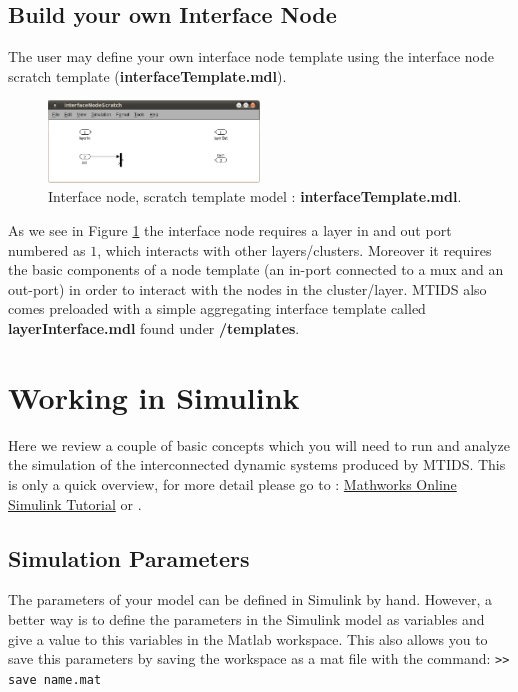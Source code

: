 \documentclass[a4paper,twoside, openright,12pt]{report}
\begin{document}
\pagebreak

\subsection{Build your own Interface Node}

The user may define your own interface node template using the interface node scratch template (\textbf{interfaceTemplate.mdl}). \\

\begin{figure}[htb]
\centering
\includegraphics[width=0.5\textwidth]{pics/interfaceTemplate.eps}
\caption[MTIDS interface node scratch template]{Interface node, scratch template model : \textbf{interfaceTemplate.mdl}.}
\label{interfaceFig}
\end{figure}
 
As we see in Figure \ref{interfaceFig} the interface node requires a layer in and out port numbered as $1$, which interacts with other layers/clusters. 
Moreover it requires the basic components of a node template (an in-port connected to a mux and an out-port) in order to interact with the nodes in the cluster/layer.
MTIDS also comes preloaded with a simple aggregating interface template called \textbf{layerInterface.mdl} found under \textbf{/templates}.
 


 

\section{Working in Simulink}\label{workinginsimulink}

Here we review a couple of basic concepts which you will need to run and analyze the simulation of the interconnected dynamic 
systems produced by MTIDS. This is only a quick overview, for more detail please go to : \href{http://www.mathworks.com/help/toolbox/simulink/simulink_product_page.html}{Mathworks Online Simulink Tutorial} or \cite{MatlabBuch}.

\subsection{Simulation Parameters}
The parameters of your model can be defined in Simulink by hand. However, a better way is to 
define the parameters in the Simulink model as variables and give a value to this variables in the Matlab workspace. This also allows you to save this parameters
by saving the workspace as a mat file with the command: \texttt{>> save name.mat}
\end{document}
